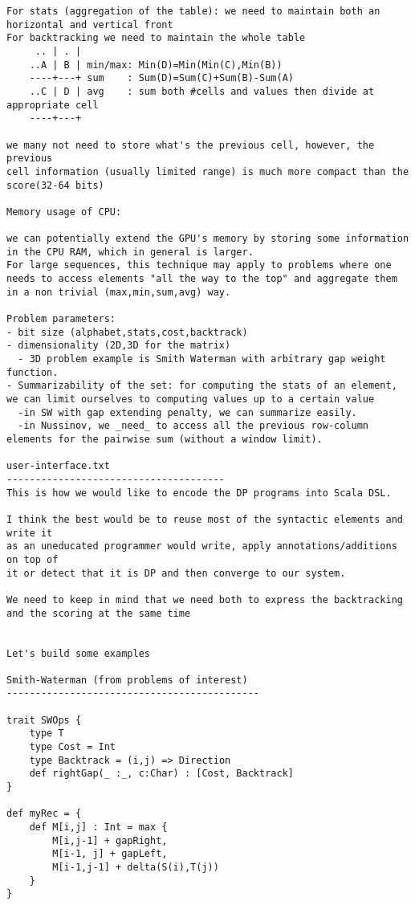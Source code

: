\documentclass[11pt]{article}
\begin{document}
\begin{verbatim}
For stats (aggregation of the table): we need to maintain both an horizontal and vertical front
For backtracking we need to maintain the whole table
     .. | . |
	..A | B | min/max: Min(D)=Min(Min(C),Min(B))
	----+---+ sum    : Sum(D)=Sum(C)+Sum(B)-Sum(A)
	..C | D | avg    : sum both #cells and values then divide at appropriate cell
	----+---+

we many not need to store what's the previous cell, however, the previous
cell information (usually limited range) is much more compact than the score(32-64 bits)

Memory usage of CPU:

we can potentially extend the GPU's memory by storing some information in the CPU RAM, which in general is larger.
For large sequences, this technique may apply to problems where one needs to access elements "all the way to the top" and aggregate them in a non trivial (max,min,sum,avg) way.

Problem parameters:
- bit size (alphabet,stats,cost,backtrack)
- dimensionality (2D,3D for the matrix)
  - 3D problem example is Smith Waterman with arbitrary gap weight function.
- Summarizability of the set: for computing the stats of an element, we can limit ourselves to computing values up to a certain value
  -in SW with gap extending penalty, we can summarize easily.
  -in Nussinov, we _need_ to access all the previous row-column elements for the pairwise sum (without a window limit).

user-interface.txt
--------------------------------------
This is how we would like to encode the DP programs into Scala DSL.

I think the best would be to reuse most of the syntactic elements and write it
as an uneducated programmer would write, apply annotations/additions on top of
it or detect that it is DP and then converge to our system.

We need to keep in mind that we need both to express the backtracking and the scoring at the same time


Let's build some examples

Smith-Waterman (from problems of interest)
--------------------------------------------

trait SWOps {
	type T
	type Cost = Int
	type Backtrack = (i,j) => Direction
	def rightGap(_ :_, c:Char) : [Cost, Backtrack]
}

def myRec = {
	def M[i,j] : Int = max {
		M[i,j-1] + gapRight,
		M[i-1, j] + gapLeft,
		M[i-1,j-1] + delta(S(i),T(j))
	}
}


\end{verbatim}
\end{document}
